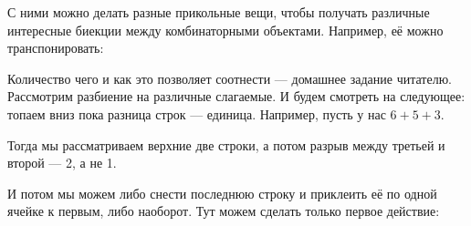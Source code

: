 \documentclass{article}
\begin{document}
\begin{itemize}
\begin{Comment}
\begin{center}
            \end{center}
            С ними можно делать разные прикольные вещи, чтобы получать различные интересные биекции между комбинаторными объектами. Например, её можно транспонировать:
            \begin{center}
            \end{center}
            Количество чего и как это позволяет соотнести --- домашнее задание читателю.\\
            Рассмотрим разбиение на различные слагаемые. И будем смотреть на следующее: топаем вниз пока разница строк --- единица. Например, пусть у нас $6+5+3$.
            \begin{center}
            \end{center}
            Тогда мы рассматриваем верхние две строки, а потом разрыв между третьей и второй --- 2, а не 1.
            \begin{center}
            \end{center}
            И потом мы можем либо снести последнюю строку и приклеить её по одной ячейке к первым, либо наоборот. Тут можем сделать только первое действие:

\end{Comment}
\end{itemize}
\end{document}
